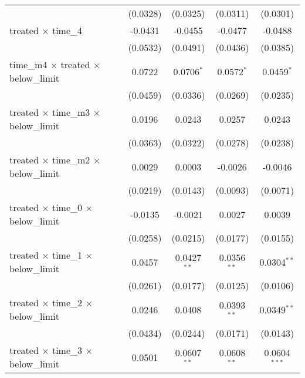 \begin{tabular}{lcccc}
                                                       & (0.0328)        & (0.0325)        & (0.0311)        & (0.0301)\\   
   treated $\times$ time\_4                            & -0.0431         & -0.0455         & -0.0477         & -0.0488\\   
                                                       & (0.0532)        & (0.0491)        & (0.0436)        & (0.0385)\\   
   time\_m4 $\times$ treated $\times$ below\_limit     & 0.0722          & 0.0706$^{*}$    & 0.0572$^{*}$    & 0.0459$^{*}$\\   
                                                       & (0.0459)        & (0.0336)        & (0.0269)        & (0.0235)\\   
   treated $\times$ time\_m3 $\times$ below\_limit     & 0.0196          & 0.0243          & 0.0257          & 0.0243\\   
                                                       & (0.0363)        & (0.0322)        & (0.0278)        & (0.0238)\\   
   treated $\times$ time\_m2 $\times$ below\_limit     & 0.0029          & 0.0003          & -0.0026         & -0.0046\\   
                                                       & (0.0219)        & (0.0143)        & (0.0093)        & (0.0071)\\   
   treated $\times$ time\_0 $\times$ below\_limit      & -0.0135         & -0.0021         & 0.0027          & 0.0039\\   
                                                       & (0.0258)        & (0.0215)        & (0.0177)        & (0.0155)\\   
   treated $\times$ time\_1 $\times$ below\_limit      & 0.0457          & 0.0427$^{**}$   & 0.0356$^{**}$   & 0.0304$^{**}$\\   
                                                       & (0.0261)        & (0.0177)        & (0.0125)        & (0.0106)\\   
   treated $\times$ time\_2 $\times$ below\_limit      & 0.0246          & 0.0408          & 0.0393$^{**}$   & 0.0349$^{**}$\\   
                                                       & (0.0434)        & (0.0244)        & (0.0171)        & (0.0143)\\   
   treated $\times$ time\_3 $\times$ below\_limit      & 0.0501          & 0.0607$^{**}$   & 0.0608$^{**}$   & 0.0604$^{***}$\\   

\end{tabular}
